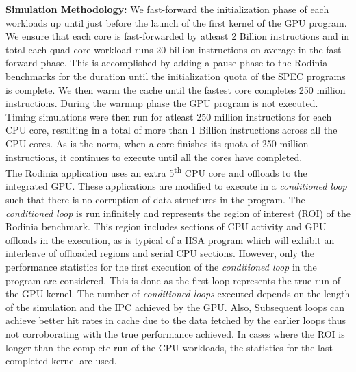 \par \textbf{Simulation Methodology:} We fast-forward the initialization phase of each workloads up until just before the launch of the first kernel of the GPU program. We ensure that each core is fast-forwarded by atleast 2 Billion instructions and in total each quad-core workload runs 20 billion instructions on average in the fast-forward phase. This is accomplished by adding a pause phase to the Rodinia benchmarks for the duration until the initialization quota of the SPEC programs is complete. We then warm the cache until the fastest core completes 250 million instructions. During the warmup phase the GPU program is not executed. Timing simulations were then run for atleast 250 million instructions for each CPU core, resulting in a total of more than 1 Billion instructions across all the CPU cores. As is the norm, when a core finishes its quota of 250 million instructions, it continues to execute until all the cores have completed. \\
The Rodinia application uses an extra 5\textsuperscript{th} CPU core and offloads to the integrated GPU. These applications are modified to execute in a \textit{conditioned loop} such that there is no corruption of data structures in the program. The \textit{conditioned loop} is run infinitely and represents the region of interest (ROI) of the Rodinia benchmark. This region includes sections of CPU activity and GPU offloads in the execution, as is typical of a HSA program which will exhibit an interleave of offloaded regions and serial CPU sections. However, only the performance statistics for the first execution of the \textit{conditioned loop} in the program are considered. 
This is done as the first loop represents the true run of the GPU kernel. The number of \textit{conditioned loops} executed depends on the length of the simulation and the IPC achieved by the GPU. Also, Subsequent loops can achieve better hit rates in cache due to the data fetched by the earlier loops thus not corroborating with the true performance achieved.
In cases where the ROI is longer than the complete run of the CPU workloads, the statistics for the last completed kernel are used. 

